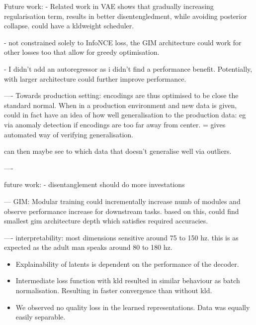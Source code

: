 \documentclass[]{book}
\begin{document}
Future work:
 - Related work in VAE shows that gradually increasing regularisation term, results in better disentengledment, while avoiding posterior collapse. could have a kldweight scheduler.
 
- not constrained solely to InfoNCE loss, the GIM architecture could work for other losses too that allow for greedy optimisation.


- I didn't add an autoregressor as i didn't find a performance benefit. Potentially, with larger architecture could further improve performance.



----
Towards production setting:
	encodings are thus optimised to be close the standard normal. When in a production environment and new data is given, could in fact have an idea of how well generalisation to the production data: eg via anomaly detection if encodings are too far away from center. 
	= gives automated way of verifying generalisation.
	
	can then maybe see to which data that doesn't generalise well via outliers.
	
----


future work:
- disentanglement should do more investations


---
GIM: Modular training
could incrementally increase numb of modules and observe performance increase for downstream tasks.
based on this, could find smallest gim architecture depth which satisfies required accuracies.

----
interpretability:
most dimensions sensitive around 75 to 150 hz. this is as expected as the adult man speaks around 80 to 180 hz.



\begin{itemize}
	\item Explainability of latents is dependent on the performance of the decoder.
	\item Intermediate loss function with kld resulted in similar behaviour as batch normalisation. Resulting in faster convergence than without kld.
	\item We observed no quality loss in the learned representations. Data was equally easily separable.
\end{itemize}








\end{document}
